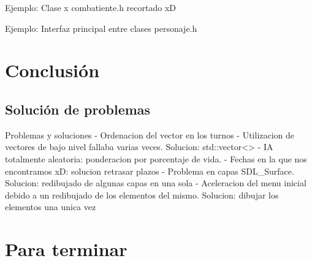 \documentclass[9pt,xcolor=svgnames]{beamer}
\begin{document}
  \begin{frame}{Ejemplo: Clase x}
   combatiente.h recortado xD
  \end{frame}
  
  
  \begin{frame}{Ejemplo: Interfaz principal entre clases}
   personaje.h
  \end{frame}
    
  


 \section{Conclusión}
 
  \subsection{Solución de problemas}

  \begin{frame}{Problemas y soluciones}
   - Ordenacion del vector en los turnos
   - Utilizacion de vectores de bajo nivel fallaba varias
     veces. Solucion: std::vector<> 
   - IA totalmente aleatoria: ponderacion por porcentaje de vida.
   - Fechas en la que nos encontramos xD: solucion retrasar plazos
   - Problema en capas SDL\_Surface. Solucion: redibujado de algunas
     capas en una sola
   - Aceleracion del menu inicial debido a un redibujado de los
     elementos del mismo. Solucion: dibujar los elementos una unica vez

  
  \end{frame}
  
  
 \section{Para terminar}
  

  
\end{document}
